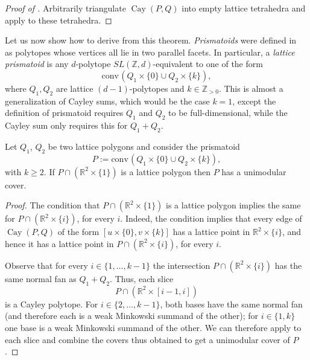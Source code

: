 \documentclass[12pt]{article}
\newcommand{\Z}{ \ensuremath{\mathbb{Z}}}
\newcommand{\R}{ \ensuremath{\mathbb{R}}}
\newcommand{\conv}{\ensuremath{\mathrm{conv}}\hspace{1pt}}
\newcommand{\cayley}{\operatorname{Cay}}
\begin{document}
\begin{proof}[Proof of ]
Arbitrarily triangulate $\cayley(P,Q)$ into empty lattice tetrahedra and apply  to these tetrahedra.
\end{proof}

Let us now show how to derive  from this theorem.
\emph{Prismatoids} were defined in~\cite{Santos-hirsch} as polytopes whose vertices all lie in two parallel facets. In particular, a \emph{lattice prismatoid} is any $d$-polytope $SL(\Z,d)$-equivalent to one of the form
\[
\conv(Q_1\times\{0\} \cup Q_2 \times \{k\}),
\]
where $Q_1,Q_2$ are lattice $(d-1)$-polytopes and $k\in \Z_{>0}$. This is almost a generalization of Cayley sums, which would be the case $k=1$, except the definition of prismatoid requires $Q_1$ and $Q_2$ to be full-dimensional, while the Cayley sum only requires this for $Q_1+Q_2$.

\begin{proposition}
\label{prop:prismatoid}
Let $Q_1$, $Q_2$ be two lattice polygons and consider the prismatoid 
\[
P:= \conv(Q_1\times\{0\} \cup Q_2 \times \{k\}),
\]
with $k\ge 2$. 
If $P\cap(\R^2\times\{1\})$ is a lattice polygon then $P$ has a unimodular cover.
\end{proposition}

\begin{proof}
The condition that $P\cap(\R^2\times\{1\})$ is a lattice polygon implies the same for $P\cap(\R^2\times\{i\})$, for every $i$. 
Indeed, the condition implies that every edge of $\cayley(P,Q)$ of the form $[u\times \{0\}, v\times \{k\}]$ has a lattice point in $\R^2\times\{i\}$, and hence it has a lattice point in $P\cap(\R^2\times\{i\})$, for every $i$.

Observe that for every $i\in \{1,\dots,k-1\}$ the intersection $P\cap(\R^2\times\{i\})$ has the same normal fan as $Q_1+Q_2$. Thus, each slice
\[
P \cap (\R^2\times[i-1,i])
\]
is a Cayley polytope. For $i\in\{2,\dots,k-1\}$,  both bases have the same normal fan (and therefore each is a weak Minkowski summand of the other); for $i\in \{1,k\}$ one base is a weak Minkowski summand of the other. We can therefore apply  to each slice and combine the covers thus obtained to get a unimodular cover of $P$.
\end{proof}
\end{document}
